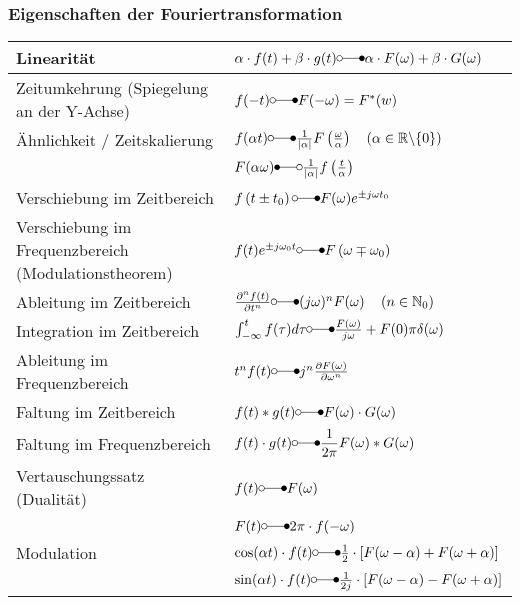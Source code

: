 \subsubsection{Eigenschaften der Fouriertransformation}
\begin{tabular}{|l|l|}
	\hline Linearität	&	$\alpha \cdot f(t)+\beta \cdot g(t) \laplace \alpha \cdot F(\omega)+\beta \cdot G(\omega)$\\
	\hline Zeitumkehrung (Spiegelung an der Y-Achse) & $f(-t) \laplace F(-\omega)=F^{*}(w)$\\ 
	\hline Ähnlichkeit / Zeitskalierung & $f(\alpha t) \laplace \frac{1}{|\alpha|} F\left(\frac{\omega}{\alpha}\right) \quad\left(\alpha \in \mathbb{R} \backslash\{0\}\right)$\\
	& $F(\alpha \omega) \Laplace \frac{1}{|\alpha|} f\left(\frac{t}{\alpha}\right)$\\
	\hline Verschiebung im Zeitbereich	& $f\left(t \pm t_{0}\right) \laplace F(\omega) e^{\pm j \omega t_{0}}$\\
	\hline Verschiebung im Frequenzbereich (Modulationstheorem)	& $f(t) e^{\pm j \omega_{0} t} \laplace F\left(\omega \mp \omega_{0}\right)$\\
	\hline Ableitung im Zeitbereich		& $\frac{\partial^{n} f(t)}{\partial t^{n}} \laplace (j \omega)^{n} F(\omega) \quad\left(n \in \mathbb{N}_{0}\right)$\\
	\hline Integration im Zeitbereich	& $\int_{-\infty}^{t} f(\tau) d \tau \laplace \frac{F(\omega)}{j \omega}+F(0) \pi \delta(\omega)$\\
	\hline Ableitung im Frequenzbereich	& $t^{n}f(t) \laplace j^{n}\frac{\partial F(\omega)}{\partial \omega^{n}}$\\
	\hline Faltung im Zeitbereich		& $f(t)*g(t) \laplace F(\omega) \cdot G(\omega)$\\
	\hline Faltung im Frequenzbereich	& $f(t) \cdot g(t) \laplace \dfrac{1}{2 \pi}F(\omega) * G(\omega)$\\
	\hline Vertauschungssatz (Dualität)	& $f(t) \laplace F(\omega)$\\
	& $F(t) \laplace 2 \pi \cdot f(-\omega)$\\
	\hline Modulation					& $\cos(\alpha t)\cdot f(t) \laplace \frac{1}{2} \cdot \left[F(\omega-\alpha)+F(\omega+\alpha)\right]$\\
	& $\sin(\alpha t)\cdot f(t) \laplace \frac{1}{2j} \cdot \left[F(\omega-\alpha)-F(\omega+\alpha)\right]$\\
	\hline
\end{tabular}